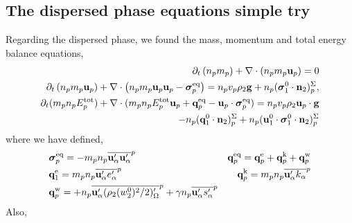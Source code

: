 \subsection{The dispersed phase equations simple try}

Regarding the dispersed phase, we found the mass, momentum and total energy balance equations, 
\begin{align*}
    \partial_t \left(n_p m_p\right)
    + \mathbf{\nabla}\cdot \left(n_pm_p\textbf{u}_p
    \right)
    = 
    0\\
    \partial_t \left(n_p m_p \textbf{u}_p\right)
    + \mathbf{\nabla}\cdot \left(n_p
    m_p \textbf{u}_p \textbf{u}_p 
    - \bm{\sigma}_p^\text{eq}
    \right)
    = 
    n_p v_p \rho_2 \textbf{g}
    + n_p (\bm{\sigma}_1^0 \cdot \textbf{n}_2)_p^\Sigma,\\
    \partial_t(m_p n_pE_p^\text{tot})
    + \mathbf{\nabla}\cdot(m_pn_p E_p^\text{tot} \textbf{u}_p 
    + \textbf{q}_p^\text{eq} - \textbf{u}_p \cdot \bm{\sigma}_p^\text{eq})
    =  n_p v_p \rho_2 \textbf{u}_p\cdot  \textbf{g}\\
    -  n_p (\textbf{q}_1^0 \cdot \textbf{n}_2)_p^\Sigma
    +  n_p (\textbf{u}_1^0 \cdot \bm{\sigma}_1^0\cdot \textbf{n}_2)_p^\Sigma
\end{align*}
where we have defined, 
\begin{align*}
    &\bm{\sigma}_p^\text{eq}
    = -  m_pn_p\overline{\textbf{u}_\alpha'\textbf{u}_\alpha'}^{p}
    &\textbf{q}_p^\text{eq}
    =\textbf{q}_p^\text{e} 
    +\textbf{q}_p^\text{k}  
    +\textbf{q}_p^\text{w}  
    \\
    &\textbf{q}_1^\text{e}
    = m_p n_p\overline{\textbf{u}_\alpha' e_\alpha'}^{p} 
    &\textbf{q}_p^\text{k}
    = m_p n_p\overline{\textbf{u}_\alpha' k_\alpha}^{p} 
    \\
    &\textbf{q}_p^\text{w}
    = 
    + n_p\overline{\textbf{u}_\alpha'(\rho_2 (w^0_2)^2/2 )'_\Omega}^{p}
    + \gamma n_p\overline{\textbf{u}_\alpha' s_\alpha'}^{p}
\end{align*}
Also, 
